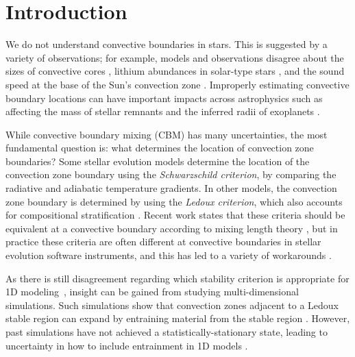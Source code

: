 
\section{Introduction}
\label{sec:introduction}
We do not understand convective boundaries in stars.
This is suggested by a variety of observations; for example, models and observations disagree about the sizes of convective cores \citep{claret_torres_2018, viani_basu_2020, pedersen_etal_2021, johnston_2021}, lithium abundances in solar-type stars \citep{pinsonneault_1997, sestito_randich_2005, carlos_etal_2019, dumont_etal_2021}, and the sound speed at the base of the Sun's convection zone \citep[see][Sec.~7.2.1]{basu_2016}.
Improperly estimating convective boundary locations can have important impacts across astrophysics such as affecting the mass of stellar remnants \citep{farmer_etal_2019, mehta_etal_2022} and the inferred radii of exoplanets \citep{basu_etal_2012, morrell_2020}.

While convective boundary mixing (CBM) has many uncertainties, the most fundamental question is: what determines the location of convection zone boundaries? 
Some stellar evolution models determine the location of the convection zone boundary using the \emph{Schwarzschild criterion}, by comparing the radiative and adiabatic temperature gradients.
In other models, the convection zone boundary is determined by using the \emph{Ledoux criterion}, which also accounts for compositional stratification \citep[][chapter 3, reviews these criteria]{salaris_cassisi_2017}.
Recent work states that these criteria should be equivalent at a convective boundary according to mixing length theory \citep{gabriel_etal_2014, mesa4, mesa5}, but in practice these criteria are often different at convective boundaries in stellar evolution software instruments, and this has led to a variety of workarounds \citep{mesa4,mesa5}.

As there is still disagreement regarding which stability criterion is appropriate for 1D modeling~\citep[see][chapter 2]{kaiser_etal_2020}, insight can be gained from studying multi-dimensional simulations.
Such simulations show that convection zones adjacent to a Ledoux stable region can expand by entraining material from the stable region \citep{meakin_arnett_2007, woodward_etal_2015, jones_etal_2017, cristini_etal_2019, fuentes_cumming_2020, andrassy_etal_2020, andrassy_etal_2021}.
However, past simulations have not achieved a statistically-stationary state, leading to uncertainty in how to include entrainment in 1D models \citep{staritsin_2013, scott_etal_2021}.

